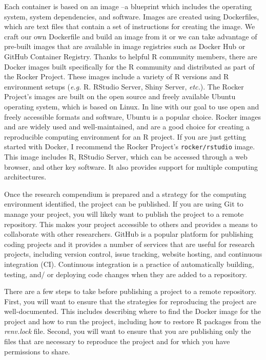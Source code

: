 \documentclass[
  letterpaper,
]{latex/krantz}
\theoremstyle{definition}
\theoremstyle{remark}
\begin{document}
Each container is based on an image --a blueprint which includes the
operating system, system dependencies, and software. Images are created
using Dockerfiles, which are text files that contain a set of
instructions for creating the image. We craft our own Dockerfile and
build an image from it or we can take advantage of pre-built images that
are available in image registries such as Docker Hub or GitHub Container
Registry. Thanks to helpful R community members, there are Docker images
built specifically for the R community and distributed as part of the
Rocker Project. These images include a variety of R versions and R
environment setups (\emph{e.g.} R. RStudio Server, Shiny Server,
\emph{etc.}). The Rocker Project's images are built on the open source
and freely available Ubuntu operating system, which is based on Linux.
In line with our goal to use open and freely accessible formats and
software, Ubuntu is a popular choice. Rocker images and are widely used
and well-maintained, and are a good choice for creating a reproducible
computing environment for an R project. If you are just getting started
with Docker, I recommend the Rocker Project's \texttt{rocker/rstudio}
image. This image includes R, RStudio Server, which can be accessed
through a web browser, and other key software. It also provides support
for multiple computing architectures.

Once the research compendium is prepared and a strategy for the
computing environment identified, the project can be published. If you
are using Git to manage your project, you will likely want to publish
the project to a remote repository. This makes your project accessible
to others and provides a means to collaborate with other researchers.
GitHub is a popular platform for publishing coding projects and it
provides a number of services that are useful for research projects,
including version control, issue tracking, website hosting, and
continuous integration (CI). Continuous integration is a practice of
automatically building, testing, and/ or deploying code changes when
they are added to a repository.

There are a few steps to take before publishing a project to a remote
repository. First, you will want to ensure that the strategies for
reproducing the project are well-documented. This includes describing
where to find the Docker image for the project and how to run the
project, including how to restore R packages from the \emph{renv.lock}
file. Second, you will want to ensure that you are publishing only the
files that are necessary to reproduce the project and for which you have
permissions to share.
\end{document}
